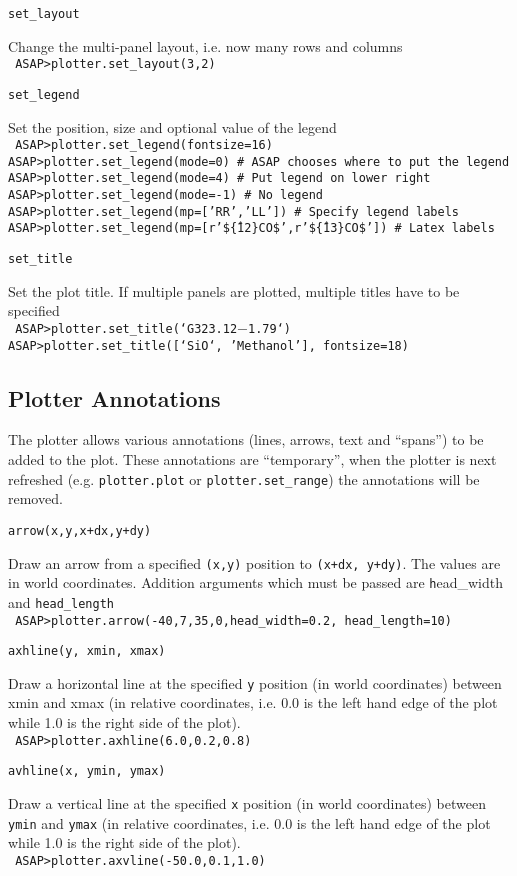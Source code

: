 \documentclass[11pt]{article}
\newcommand{\cmd}[1]{{\tt #1}}
\newcommand{\commanddef}[3]{
  \begin{minipage}[t]{27mm}\tt #1\end{minipage}\hspace{3mm}
  \begin{minipage}[t]{\textwidth-30mm}#2 \\ \tt #3\end{minipage}
}
\newcommand{\bigcommanddef}[3]{
  \begin{minipage}[t]{45mm}\tt #1\end{minipage}\hspace{3mm}
  \begin{minipage}[t]{\textwidth-47mm}#2 \\ \tt #3\end{minipage}
}
\begin{document}
\commanddef{set\_layout}{Change the multi-panel layout, i.e. now many
  rows and columns}{
  ASAP>plotter.set\_layout(3,2)
}

\commanddef{set\_legend}{Set the position, size and optional value of the legend}{
  ASAP>plotter.set\_legend(fontsize=16)\\
  ASAP>plotter.set\_legend(mode=0)  \# ASAP chooses where to put the legend\\
  ASAP>plotter.set\_legend(mode=4)  \# Put legend on lower right\\
  ASAP>plotter.set\_legend(mode=-1) \# No legend\\
  ASAP>plotter.set\_legend(mp=['RR','LL']) \# Specify legend labels\\
  ASAP>plotter.set\_legend(mp=[r'\$\^\{12\}CO\$',r'\$\^\{13\}CO\$']) \# Latex labels
}

\commanddef{set\_title}{Set the plot title. If multiple panels are
  plotted, multiple titles have to be specified}{
  ASAP>plotter.set\_title(`G323.12$-$1.79`)\\
  ASAP>plotter.set\_title([`SiO`, 'Methanol'], fontsize=18)\\
}

\subsection{Plotter Annotations}

The plotter allows various annotations (lines, arrows, text and
``spans'') to be added to the plot. These annotations are
``temporary'', when the plotter is next refreshed
(e.g. \cmd{plotter.plot} or \cmd{plotter.set\_range}) the annotations
will be removed. 

\bigcommanddef{arrow(x,y,x+dx,y+dy)}{Draw an arrow from a specified
\cmd{(x,y)} position to \cmd{(x+dx, y+dy)}. The values are in world
coordinates. Addition arguments which must be passed are {\cmd head\_width} and \cmd{head\_length}}{
  ASAP>plotter.arrow(-40,7,35,0,head\_width=0.2, head\_length=10)
}

\bigcommanddef{axhline(y, xmin, xmax)}{Draw a horizontal line at the
specified \cmd{y} position (in world coordinates) between xmin and xmax
(in relative coordinates, i.e. 0.0 is the left hand edge of the plot
while 1.0 is the right side of the plot).}{
 ASAP>plotter.axhline(6.0,0.2,0.8)
}

\bigcommanddef{avhline(x, ymin, ymax)}{Draw a vertical line at the
specified \cmd{x} position (in world coordinates) between \cmd{ymin}
and \cmd{ymax} (in relative coordinates, i.e. 0.0 is the left hand edge
of the plot while 1.0 is the right side of the plot).}{
 ASAP>plotter.axvline(-50.0,0.1,1.0)
}
\end{document}
